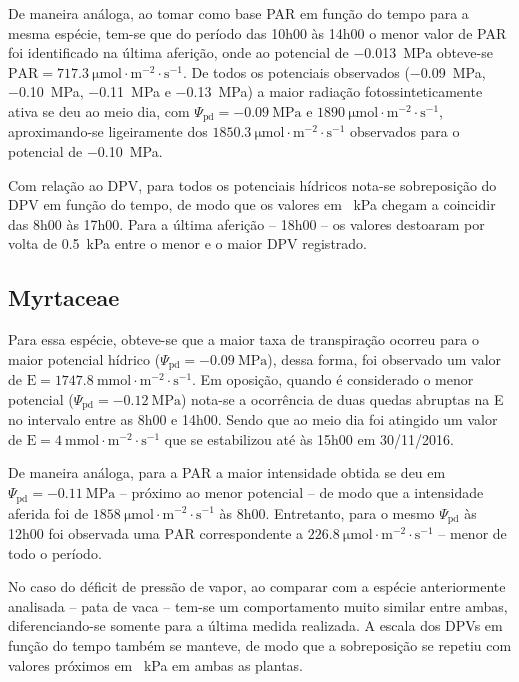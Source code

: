 \documentclass[a4paper, 12pt]{article}
\begin{document}
	De maneira análoga, ao tomar como base PAR em função do tempo para a mesma espécie, tem-se que do período das 10h00 às 14h00 o menor valor de PAR foi identificado na última aferição, onde ao potencial de \SI{-.013}{\mega\pascal} obteve-se $\textrm{PAR}=\SI{717.3}{\micro\mole\cdot\meter^{-2}\cdot\second^{-1}}$. De todos os potenciais observados (\SI{-.09}{\mega\pascal}, \SI{-.10}{\mega\pascal}, \SI{-.11}{\mega\pascal} e \SI{-.13}{\mega\pascal}) a maior radiação fotossinteticamente ativa se deu ao meio dia, com $\Psi_{\textrm{pd}}=\SI{-0.09}{\mega\pascal}$ e $\SI{1890}{\micro\mole\cdot\meter^{-2}\cdot\second^{-1}}$, aproximando-se ligeiramente dos $\SI{1850.3}{\micro\mole\cdot\meter^{-2}\cdot\second^{-1}}$ observados para o potencial de \SI{-.10}{\mega\pascal}.
	
	Com relação ao DPV, para todos os potenciais hídricos nota-se sobreposição do DPV em função do tempo, de modo que os valores em \SI{}{\kilo\pascal} chegam a coincidir das 8h00 às 17h00. Para a última aferição -- 18h00 -- os valores destoaram por volta de \SI{0.5}{\kilo\pascal} entre o menor e o maior DPV registrado.
	
	\subsection{Myrtaceae}
	
	Para essa espécie, obteve-se que a maior taxa de transpiração ocorreu para o maior potencial hídrico ($\Psi_{\textrm{pd}}=\SI{-0.09}{\mega\pascal}$), dessa forma, foi observado um valor de $\textrm{E}=\SI{1747.8}{\milli\mole\cdot\meter^{-2}\cdot\second^{-1}}$. Em oposição, quando é considerado o menor potencial ($\Psi_{\textrm{pd}}=\SI{-0.12}{\mega\pascal}$) nota-se a ocorrência de duas quedas abruptas na E no intervalo entre as 8h00 e 14h00. Sendo que ao meio dia foi atingido um valor de $\textrm{E}=\SI{4}{\milli\mole\cdot\meter^{-2}\cdot\second^{-1}}$ que se estabilizou até às 15h00 em 30/11/2016.
	
	De maneira análoga, para a PAR a maior intensidade obtida se deu em $\Psi_{\textrm{pd}}=\SI{-0.11}{\mega\pascal}$ -- próximo ao menor potencial -- de modo que a intensidade aferida foi de $\SI{1858}{\micro\mole\cdot\meter^{-2}\cdot\second^{-1}}$ às 8h00. Entretanto, para o mesmo $\Psi_{\textrm{pd}}$ às 12h00 foi observada uma $\textrm{PAR}$ correspondente a $\SI{226.8}{\micro\mole\cdot\meter^{-2}\cdot\second^{-1}}$ -- menor de todo o período.	
	
	No caso do déficit de pressão de vapor, ao comparar com a espécie anteriormente analisada -- pata de vaca -- tem-se um comportamento muito similar entre ambas, diferenciando-se somente para a última medida realizada. A escala dos DPVs em função do tempo também se manteve, de modo que a sobreposição se repetiu com valores próximos em \SI{}{\kilo\pascal} em ambas as plantas.
	
\end{document}
